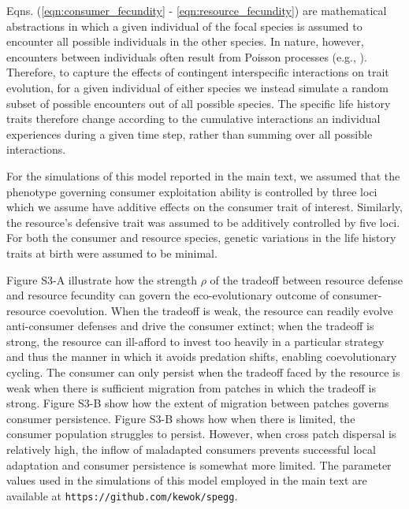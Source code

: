 \documentclass[11pt]{article}
\begin{document}
\begin{linenumbers}
Eqns. (\ref{eqn:consumer_fecundity} - \ref{eqn:resource_fecundity}) are mathematical abstractions in which a given individual of the focal species is assumed to encounter all possible individuals in the other species. In nature, however, encounters between individuals often result from Poisson processes (e.g., \citealt{hassell78}). Therefore, to capture the effects of contingent interspecific interactions on trait evolution, for a given individual of either species we instead simulate a random subset of possible encounters out of all possible species. The specific life history traits therefore change according to the cumulative interactions an individual experiences during a given time step, rather than summing over all possible interactions.

For the simulations of this model reported in the main text, we assumed that the phenotype governing consumer exploitation ability is controlled by three loci which we assume have additive effects on the consumer trait of interest. Similarly, the resource's defensive trait was assumed to be additively controlled by five loci. For both the consumer and resource species, genetic variations in the life history traits at birth were assumed to be minimal.

Figure S3-A illustrate how the strength $\rho$ of the tradeoff between resource defense and resource fecundity can govern the eco-evolutionary outcome of consumer-resource coevolution. When the tradeoff is weak, the resource can readily evolve anti-consumer defenses and drive the consumer extinct; when the tradeoff is strong, the resource can ill-afford to invest too heavily in a particular strategy and thus the manner in which it avoids predation shifts, enabling coevolutionary cycling. The consumer can only persist when the tradeoff faced by the resource is weak when there is sufficient migration from patches in which the tradeoff is strong. Figure S3-B show how the extent of migration between patches governs consumer persistence. Figure S3-B shows how when there is limited, the consumer population struggles to persist. However, when cross patch dispersal is relatively high, the inflow of maladapted consumers prevents successful local adaptation and consumer persistence is somewhat more limited. The parameter values used in the simulations of this model employed in the main text are available at \nolinkurl{https://github.com/kewok/spegg}.

\end{linenumbers}

	
	
\newpage
\end{document}
